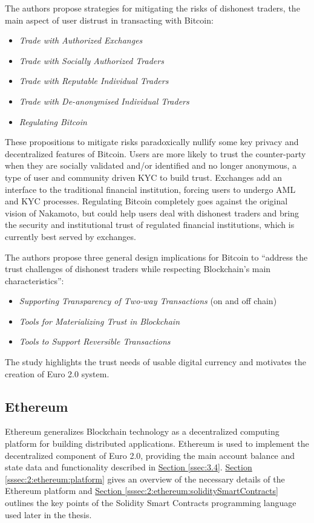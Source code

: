 \documentclass[a4paper,12pt]{article} %
\newcommand{\hypersectionref}[1]{\hyperref[#1]{Section \ref{#1}}}
\begin{document}
The authors propose strategies for mitigating the risks of dishonest traders, the main aspect of user distrust in transacting with Bitcoin:
\begin{itemize}
	\item \textit{Trade with Authorized Exchanges}
	\item \textit{Trade with Socially Authorized Traders}
	\item \textit{Trade with Reputable Individual Traders}
	\item \textit{Trade with De-anonymised Individual Traders}
	\item \textit{Regulating Bitcoin}
\end{itemize}
These propositions to mitigate risks paradoxically nullify some key privacy and decentralized features of Bitcoin. Users are more likely to trust the counter-party when they are socially validated and/or identified and no longer anonymous, a type of user and community driven KYC to build trust. Exchanges add an interface to the traditional financial institution, forcing users to undergo AML and KYC processes. Regulating Bitcoin completely goes against the original vision of Nakamoto, but could help users deal with dishonest traders and bring the security and institutional trust of regulated financial institutions, which is currently best served by exchanges.

The authors propose three general design implications for Bitcoin to ``address the trust challenges of dishonest traders while respecting Blockchain's main characteristics''\cite{sas2016design}:
\begin{itemize}
	\item \textit{Supporting Transparency of Two-way Transactions} (on and off chain)
	\item \textit{Tools for Materializing Trust in Blockchain}
	\item \textit{Tools to Support Reversible Transactions}
\end{itemize}

The study highlights the trust needs of usable digital currency and motivates the creation of Euro 2.0 system.

\subsection{Ethereum} \label{ssec:2:ethereum}

Ethereum generalizes Blockchain technology as a decentralized computing platform for building distributed applications. Ethereum is used to implement the decentralized component of Euro 2.0, providing the main account balance and state data and functionality described in \hypersectionref{ssec:3.4}. \hypersectionref{sssec:2:ethereum:platform} gives an overview of the necessary details of the Ethereum platform and \hypersectionref{sssec:2:ethereum:soliditySmartContracts} outlines the key points of the Solidity Smart Contracts programming language used later in the thesis.
\end{document}
